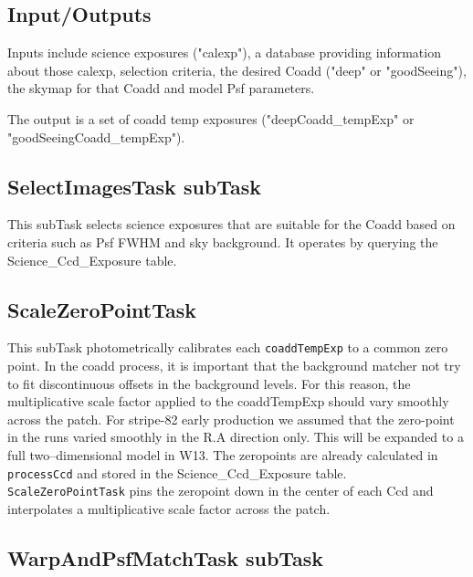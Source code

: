 \documentclass[12pt]{article}
\begin{document}
\subsection{Input/Outputs}

Inputs include science exposures ("calexp"), a database providing information about
those calexp, selection criteria, the desired Coadd ("deep" or "goodSeeing"),
the skymap for that Coadd and model Psf parameters.

The output is a set of coadd temp exposures ("deepCoadd\_tempExp" or "goodSeeingCoadd\_tempExp").

\subsection{SelectImagesTask subTask} 

This subTask selects science exposures that are suitable for the Coadd
based on criteria such as Psf FWHM and sky background. It operates by
querying the Science\_Ccd\_Exposure table.

\subsection{ScaleZeroPointTask} 

This subTask  photometrically calibrates each {\tt coaddTempExp} to a common zero point. 
%
In the coadd process, it is important that the background matcher not try to fit discontinuous offsets in the background levels. For this reason, the multiplicative scale factor applied to the coaddTempExp should vary smoothly across the patch. For stripe-82 early production we assumed that the zero-point in the runs varied smoothly in the R.A direction only.  This will be expanded to a full two--dimensional model in W13.  The zeropoints are already calculated in {\tt processCcd} and stored in the Science\_Ccd\_Exposure table. {\tt ScaleZeroPointTask} pins the zeropoint down in the center of each Ccd and interpolates a multiplicative scale factor across the patch. 

\subsection{WarpAndPsfMatchTask subTask} 
\end{document}
